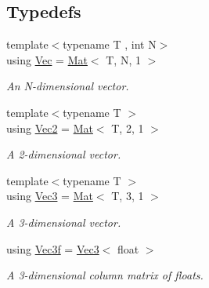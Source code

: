 \subsection*{Typedefs}
\begin{DoxyCompactItemize}
\item 
\mbox{\label{namespacetao_a8379edfd9f7227e91eaafa321727dbe0}} 
{\footnotesize template$<$typename T , int N$>$ }\\using \mbox{\hyperlink{namespacetao_a8379edfd9f7227e91eaafa321727dbe0}{Vec}} = \mbox{\hyperlink{classtao_1_1_mat}{Mat}}$<$ T, N, 1 $>$
\begin{DoxyCompactList}\small\item\em An N-\/dimensional vector. \end{DoxyCompactList}\item 
\mbox{\label{namespacetao_a7c689316b82c94e7228f42ac874a548b}} 
{\footnotesize template$<$typename T $>$ }\\using \mbox{\hyperlink{namespacetao_a7c689316b82c94e7228f42ac874a548b}{Vec2}} = \mbox{\hyperlink{classtao_1_1_mat}{Mat}}$<$ T, 2, 1 $>$
\begin{DoxyCompactList}\small\item\em A 2-\/dimensional vector. \end{DoxyCompactList}\item 
\mbox{\label{namespacetao_ae482eac12cddc119b58d00c3cd25473e}} 
{\footnotesize template$<$typename T $>$ }\\using \mbox{\hyperlink{namespacetao_ae482eac12cddc119b58d00c3cd25473e}{Vec3}} = \mbox{\hyperlink{classtao_1_1_mat}{Mat}}$<$ T, 3, 1 $>$
\begin{DoxyCompactList}\small\item\em A 3-\/dimensional vector. \end{DoxyCompactList}\item 
\mbox{\label{namespacetao_a28b01eba8967a06df1f42352e3dcf752}} 
using \mbox{\hyperlink{namespacetao_a28b01eba8967a06df1f42352e3dcf752}{Vec3f}} = \mbox{\hyperlink{namespacetao_ae482eac12cddc119b58d00c3cd25473e}{Vec3}}$<$ float $>$
\begin{DoxyCompactList}\small\item\em A 3-\/dimensional column matrix of floats. \end{DoxyCompactList}\item 

\end{DoxyCompactItemize}
